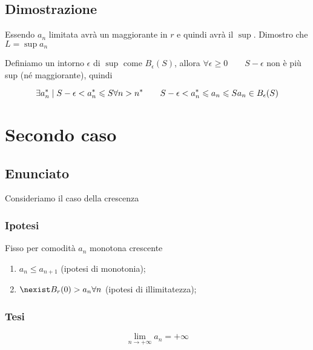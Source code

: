 \documentclass[../../dimostrazioni]{subfiles}
\begin{document}
            \subsection*{Dimostrazione}
                Essendo \(a_n\) limitata avrà un maggiorante in \(r\) e quindi avrà il \(\sup\).
                Dimostro che \(L = \sup{a_n}\)

                Definiamo un intorno \(\epsilon\) di \(\sup\) come \(B_\epsilon (S)\), allora
                \(\forall \epsilon \geqslant 0 \qquad S-\epsilon\) non è più sup (né maggiorante), quindi

                \[
                    \exists a_n^* \mid S-\epsilon < a_n^* \leqslant S \\
                    \forall n > n^* \qquad S-\epsilon < a_n^* \leqslant a_n \leqslant S \\
                    a_n \in B_\epsilon(S) 
                \]                
                
        \section*{Secondo caso}
            \subsection*{Enunciato}
            Consideriamo il caso della crescenza
                
            \subsubsection*{Ipotesi}
                 
            Fisso per comodità \(a_n\) monotona crescente

            \begin{enumerate}
               \indentitem \item \(a_n \leqslant a_{n+1}\) (ipotesi di monotonia);
               \indentitem \item \(\nexist B_r(0) > {a_n} \forall n \) (ipotesi di illimitatezza);
            \end{enumerate}
        
            \subsubsection*{Tesi}
                \[\lim_{n \to +\infty} a_n = +\infty\]
    
\end{document}
